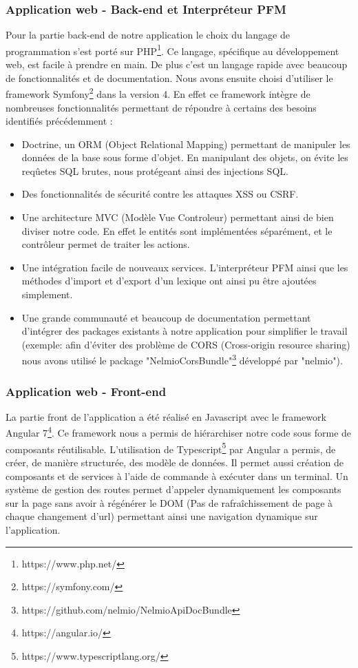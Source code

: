 \documentclass[12pt,a4paper]{article}
\begin{document}
\subsubsection{Application web - Back-end et Interpréteur PFM}
Pour la partie back-end de notre application le choix du langage de programmation s'est porté sur PHP\footnote{https://www.php.net/}. 
Ce langage, spécifique au développement web, est facile à prendre en main. De plus c'est un langage rapide avec beaucoup de fonctionnalités et de documentation.
\smallbreak
Nous avons ensuite choisi d'utiliser le framework Symfony\footnote{https://symfony.com/} dans la version 4. 
En effet ce framework intègre de nombreuses fonctionnalités permettant de répondre à certains des besoins identifiés précédemment :
\begin{itemize}
\item Doctrine, un ORM (Object Relational Mapping) permettant de manipuler les données de la base sous forme d'objet. En manipulant des objets, on évite les reqûetes SQL brutes, nous protégeant ainsi des injections SQL.
\item Des fonctionnalités de sécurité contre les attaques XSS ou CSRF. 
\item Une architecture MVC (Modèle Vue Controleur) permettant ainsi de bien diviser notre code. En effet le entités sont implémentées séparément, et le contrôleur permet de traiter les actions. 
\item Une intégration facile de nouveaux services. L'interpréteur PFM ainsi que les méthodes d'import et d'export d'un lexique ont ainsi pu être ajoutées simplement.
\item Une grande communauté et beaucoup de documentation permettant d'intégrer des packages existants à notre application pour simplifier le travail (exemple: afin d'éviter des problème de CORS (Cross-origin resource sharing) nous avons utilisé le package "NelmioCorsBundle"\footnote{https://github.com/nelmio/NelmioApiDocBundle} développé par "nelmio").

\end{itemize}
\smallbreak

\subsubsection{Application web - Front-end}

La partie front de l'application a été réalisé en Javascript avec le framework Angular 7\footnote{https://angular.io/}.
Ce framework nous a permis de hiérarchiser notre code sous forme de composants réutilisable.
L'utilisation de Typescript\footnote{https://www.typescriptlang.org/} par Angular a permis, de créer, de manière structurée, des modèle de données.
Il permet aussi création de composants et de services à l'aide de commande à exécuter dans un terminal.
Un système de gestion des routes permet d'appeler dynamiquement les composants sur la page sans avoir à régénérer le DOM (Pas de rafraîchissement de page à chaque changement d'url) permettant ainsi une navigation dynamique sur l'application.
\end{document}
